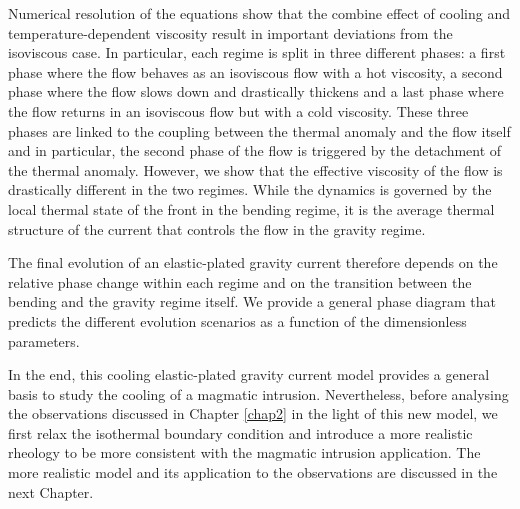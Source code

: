 Numerical resolution of the equations  show that the combine effect of
cooling  and  temperature-dependent   viscosity  result  in  important
deviations from  the isoviscous case.   In particular, each  regime is
split in three different phases: a  first phase where the flow behaves
as an isoviscous  flow with a hot viscosity, a  second phase where the
flow slows  down and drastically thickens  and a last phase  where the
flow returns in  an isoviscous flow but with a  cold viscosity.  These
three phases  are linked to  the coupling between the  thermal anomaly
and the flow itself and in particular, the second phase of the flow is
triggered by the detachment of  the thermal anomaly.  However, we show
that the effective  viscosity of the flow is  drastically different in
the two regimes.  While the dynamics  is governed by the local thermal
state of  the front in the  bending regime, it is  the average thermal
structure of the current that controls the flow in the gravity regime.

The  final evolution  of an  elastic-plated gravity  current therefore
depends on  the relative phase  change within  each regime and  on the
transition  between the  bending and  the gravity  regime itself.   We
provide a general phase diagram  that predicts the different evolution
scenarios as a function of the dimensionless parameters.

In the end, this cooling elastic-plated gravity current model provides
a   general   basis    to   study   the   cooling    of   a   magmatic
intrusion. Nevertheless,  before analysing the  observations discussed
in Chapter \ref{chap2} in the light  of this new model, we first relax
the  isothermal  boundary condition  and  introduce  a more  realistic
rheology   to  be   more  consistent   with  the   magmatic  intrusion
application.   The more  realistic model  and its  application to  the
observations are discussed in the next Chapter.


